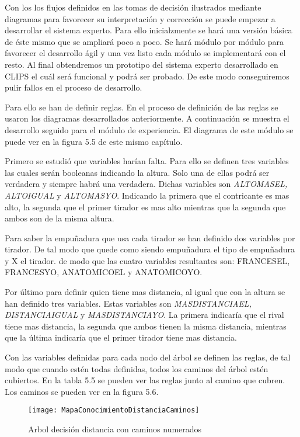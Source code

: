 Con los los flujos definidos en las tomas de decisión ilustrados mediante diagramas para favorecer
su interpretación y corrección se puede empezar a desarrollar el sistema experto. Para ello inicialzmente
se hará una versión básica de éste mismo que se ampliará poco a poco. Se hará módulo por módulo
para favorecer el desarrollo ágil y una vez listo cada módulo se implementará con el resto.
Al final obtendremos un prototipo del sistema experto desarrollado en CLIPS el cuál será
funcional y podrá ser probado. De este modo conseguiremos pulir fallos en el proceso de desarrollo.

Para ello se han de definir reglas. En el proceso de definición de las reglas se usaron los
diagramas desarrollados anteriormente. A continuación se muestra el desarrollo seguido para el
módulo de experiencia. El diagrama de este módulo se puede ver en la figura 5.5 de este mismo capítulo.

Primero se estudió que variables harían falta. Para ello se definen tres variables las cuales serán booleanas
indicando la altura. Solo una de ellas podrá ser verdadera y siempre habrá una verdadera. Dichas variables son
\textit{ALTOMASEL, ALTOIGUAL} y \textit{ALTOMASYO}. Indicando la primera que el contricante es mas alto, la segunda
que el primer tirador es mas alto mientras que la segunda que ambos son de la misma altura.

Para saber la empuñadura que usa cada tirador se han definido dos variables por tirador. De tal modo que quede como
 siendo empuñadura el tipo de empuñadura y X el tirador. de modo que las cuatro variables
resultantes son: FRANCESEL, FRANCESYO, ANATOMICOEL y ANATOMICOYO.

Por último para definir quien tiene mas distancia, al igual que con la altura se han definido tres variables.
Estas variables son \textit{MASDISTANCIAEL, DISTANCIAIGUAL} y \textit{MASDISTANCIAYO}. La primera indicaría
que el rival tiene mas distancia, la segunda que ambos tienen la misma distancia, mientras que la última
indicaría que el primer tirador tiene mas distancia.

Con las variables definidas para cada nodo del árbol se definen las reglas, de tal modo que
cuando estén todas definidas, todos los caminos del árbol estén cubiertos. En la tabla 5.5 se pueden ver
las reglas junto al camino que cubren. Los caminos se pueden ver en la figura 5.6.

\begin{figure}[htb]
  \centering
    \texttt{[image: MapaConocimientoDistanciaCaminos]}
  \caption[Arbol decisión distancia con caminos numerados]{Arbol decisión distancia con caminos numerados}
  \label{fig:Arbol decisión distancia con caminos numerados}
\end{figure}

